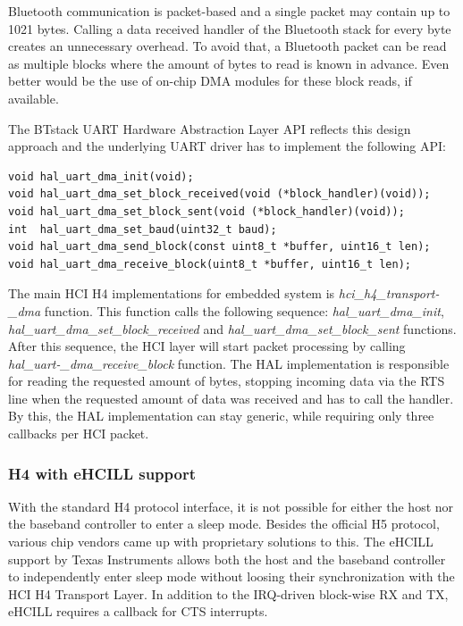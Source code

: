 \documentclass[a4paper,titlepage,oneside,12pt]{amsart} %
\begin{document}
Bluetooth communication is packet-based and a single packet may contain up to 1021 bytes. Calling a data received handler of the Bluetooth stack for every byte creates an unnecessary overhead. To avoid that, a Bluetooth packet can be read as multiple blocks where the amount of bytes to read is known in advance. Even better would be the use of on-chip DMA modules for these block reads, if available.


The BTstack UART Hardware Abstraction Layer API reflects this design approach and the underlying UART driver has to implement the following API:

 \begin{lstlisting}
void hal_uart_dma_init(void);
void hal_uart_dma_set_block_received(void (*block_handler)(void));
void hal_uart_dma_set_block_sent(void (*block_handler)(void));
int  hal_uart_dma_set_baud(uint32_t baud);
void hal_uart_dma_send_block(const uint8_t *buffer, uint16_t len);
void hal_uart_dma_receive_block(uint8_t *buffer, uint16_t len);
 \end{lstlisting}
 
The main HCI H4 implementations for embedded system is \emph{hci\_h4\_transport-\_dma} function. This function calls the following sequence: \emph{hal\_uart\_dma\_init}, \emph{hal\_uart\_dma\_set\_block\_received} and \emph{hal\_uart\_dma\_set\_block\_sent} functions. \mbox{After} this sequence, the HCI layer will start packet processing by calling \emph{hal\_uart-\_dma\_receive\_block} function. The HAL implementation is responsible for reading the requested amount of bytes, stopping incoming data via the RTS line when the requested amount of data was received and has to call the handler. By this, the HAL implementation can stay generic, while requiring only three callbacks per HCI packet. 

\subsubsection{H4 with eHCILL support}
With the standard H4 protocol interface, it is not possible for either the host nor the baseband controller to enter a sleep mode. Besides the official H5 protocol, various chip vendors came up with proprietary solutions to this. The eHCILL support by Texas Instruments allows both the host and the baseband controller to independently enter sleep mode without loosing their synchronization with the HCI H4 Transport Layer. In addition to the IRQ-driven block-wise RX and TX, eHCILL requires a callback for CTS interrupts.
\end{document}
